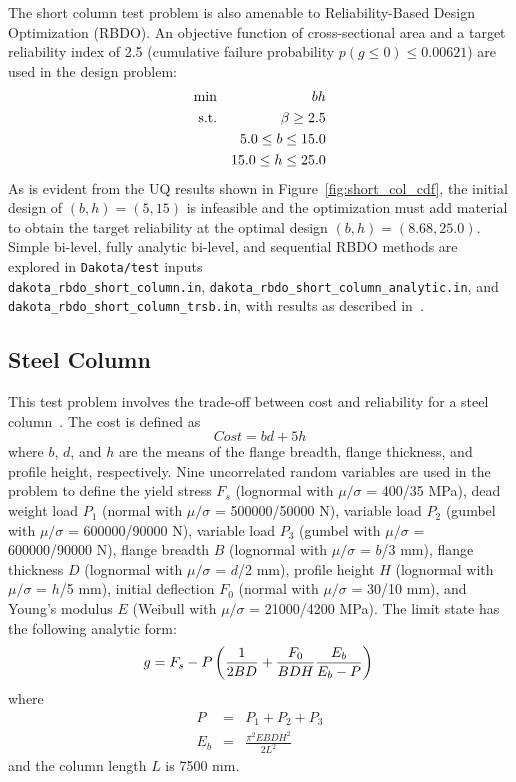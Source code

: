 The short column test problem is also amenable to Reliability-Based Design Optimization (RBDO). An
objective function of cross-sectional area and a target reliability
index of 2.5 (cumulative failure probability $p(g \le 0) \le 0.00621$) 
are used in the design problem:
\begin{eqnarray}
\min       & & bh \nonumber \\
{\rm s.t.} & & \beta \geq 2.5 \nonumber \\
           & &  5.0 \leq b \leq 15.0 \nonumber \\
           & & 15.0 \leq h \leq 25.0
\end{eqnarray}
As is evident from the UQ results shown in
Figure~\ref{fig:short_col_cdf}, the initial design of $(b, h) = (5,
15)$ is infeasible and the optimization must add material to obtain
the target reliability at the optimal design $(b, h) = (8.68, 25.0)$.
Simple bi-level, fully analytic bi-level, and sequential RBDO methods
are explored in {\tt Dakota/test} inputs \\
\texttt{dakota\_rbdo\_short\_column.in},
\texttt{dakota\_rbdo\_short\_column\_analytic.in}, and\\
\texttt{dakota\_rbdo\_short\_column\_trsb.in}, with results as
described in~\cite{Eld05,Eld06a}.

\subsection{Steel Column}\label{additional:steel_column}

This test problem involves the trade-off between cost and
reliability for a steel column~\cite{Kus97}. The cost is defined as
\begin{equation}
Cost = b d + 5 h
\end{equation}
where $b$, $d$, and $h$ are the means of the flange breadth, flange
thickness, and profile height, respectively. Nine uncorrelated random
variables are used in the problem to define the yield stress $F_s$
(lognormal with $\mu/\sigma$ = 400/35 MPa), dead weight load $P_1$
(normal with $\mu/\sigma$ = 500000/50000 N), variable load $P_2$
(gumbel with $\mu/\sigma$ = 600000/90000 N), variable load $P_3$
(gumbel with $\mu/\sigma$ = 600000/90000 N), flange breadth $B$
(lognormal with $\mu/\sigma$ = $b$/3 mm), flange thickness $D$
(lognormal with $\mu/\sigma$ = $d$/2 mm), profile height $H$
(lognormal with $\mu/\sigma$ = $h$/5 mm), initial deflection $F_0$
(normal with $\mu/\sigma$ = 30/10 mm), and Young's modulus $E$ (Weibull
with $\mu/\sigma$ = 21000/4200 MPa). The limit state has the
following analytic form:
\begin{equation}
g = F_s - P \left( \frac{1}{2 B D} + 
\frac{F_0}{B D H} \frac{E_b}{E_b - P} \right)\\
\end{equation}
where
\begin{eqnarray}
P   & = & P_1 + P_2 + P_3 \\
E_b & = & \frac{\pi^2 E B D H^2}{2 L^2}
\end{eqnarray}
and the column length $L$ is 7500 mm.


